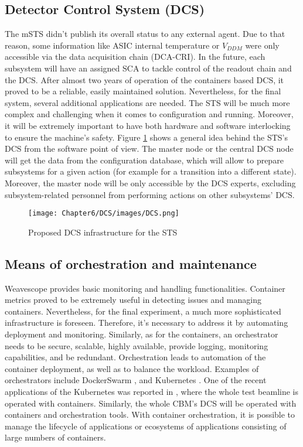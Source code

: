 \subsection{Detector Control System (DCS)}
The mSTS didn't publish its overall status to any external agent. Due to that reason, some information like \gls{ASIC} internal temperature or $V_{DDM}$ were only accessible via the data acquisition chain (\gls{DCA}-\gls{CRI}). In the future, each subsystem will have an assigned \gls{SCA} to tackle control of the readout chain and the DCS. After almost two years of operation of the containers based \gls{DCS}, it proved to be a reliable, easily maintained solution. Nevertheless, for the final system, several additional applications are needed. The STS will be much more complex and challenging when it comes to configuration and running. Moreover, it will be extremely important to have both hardware and software interlocking to ensure the machine's safety.
Figure \ref{fig_arch} shows a general idea behind the STS's DCS from the software point of view. The master node or the central DCS node will get the data from the configuration database, which will allow to prepare subsystems for a given action (for example for a transition into a different state). Moreover, the master node will be only accessible by the DCS experts, excluding subsystem-related personnel from performing actions on other subsystems' DCS. 

\begin{figure}[!h]
\centering
\texttt{[image: Chapter6/DCS/images/DCS.png]}
\caption{Proposed DCS infrastructure for the STS}
\label{fig_arch}
\end{figure}
\subsection{Means of orchestration and maintenance} 
Weavescope provides basic monitoring and handling functionalities. Container metrics proved to be extremely useful in detecting issues and managing containers. Nevertheless, for the final experiment, a much more sophisticated infrastructure is foreseen. Therefore, it's necessary to address it by automating deployment and monitoring. Similarly, as for the containers, an orchestrator needs to be secure, scalable, highly available, provide logging, monitoring capabilities, and be redundant. Orchestration leads to automation of the container deployment, as well as to balance the workload. 
Examples of orchestrators include DockerSwarm \cite{DockerSwarm}, and Kubernetes \cite{Kubernetes}. One of the recent applications of the Kubernetes was reported in \cite{ICALEPCS2021:Diamond}, where the whole test beamline is operated with containers. Similarly, the whole CBM's DCS will be operated with containers and orchestration tools. 
With container orchestration, it is possible to manage the lifecycle of applications or ecosystems of applications consisting of large numbers of containers. 

